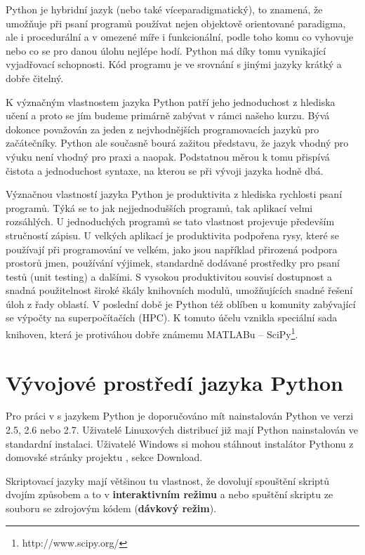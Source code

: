 Python je hybridní jazyk (nebo také víceparadigmatický), to znamená, že umožňuje při psaní programů používat nejen objektově orientované paradigma, ale i procedurální a v omezené míře i funkcionální, podle toho komu co vyhovuje nebo co se pro danou úlohu nejlépe hodí. Python má díky tomu vynikající vyjadřovací schopnosti. Kód programu je ve srovnání s jinými jazyky krátký a dobře čitelný.

K význačným vlastnostem jazyka Python patří jeho jednoduchost z hlediska učení a proto se jím budeme primárně zabývat v rámci našeho kurzu. Bývá dokonce považován za jeden z nejvhodnějších programovacích jazyků pro začátečníky. Python ale současně bourá zažitou před\-stavu, že jazyk vhodný pro výuku není vhodný pro praxi a naopak. Podstatnou měrou k tomu přispívá čistota a jednoduchost syntaxe, na kterou se při vývoji jazyka hodně dbá.

Význačnou vlastností jazyka Python je produktivita z hlediska rychlosti psaní programů. Týká se to jak nejjednodušších programů, tak aplikací velmi rozsáhlých. U jednoduchých programů se tato vlastnost projevuje především stručností zápisu. U velkých aplikací je produktivita podpořena rysy, které se používají při programování ve velkém, jako jsou například přirozená podpora prostorů jmen, používání výjimek, standard\-ně dodávané prostředky pro psaní testů (unit testing) a dalšími. S vysokou produktivitou souvisí dostupnost a snadná použitelnost široké škály knihovních modulů, umožňujících snadné řešení úloh z řady oblastí.
V poslední době je Python též oblíben u komunity zabývající se výpočty na superpočítačích (HPC). K tomuto účelu vznikla
speciální sada knihoven, která je protiváhou dobře známemu MATLABu -- SciPy\footnote{http://www.scipy.org/}.

\section{Vývojové prostředí jazyka Python}
Pro práci v s jazykem Python je doporučováno mít nainstalován Python ve verzi 2.5, 2.6 nebo 2.7. Uživatelé Linuxových distribucí již mají Python nainstalován ve standardní instalaci. Uživatelé Windows si mohou stáhnout instalátor Pythonu z domovské stránky projektu \cite{python-web}, sekce Download.

Skriptovací jazyky mají většinou tu vlastnost, že dovolují spouštění skriptů dvojím způsobem a to v \textbf{interaktivním režimu} a nebo spuštění skriptu ze souboru se zdrojovým kódem (\textbf{dávkový režim}).

